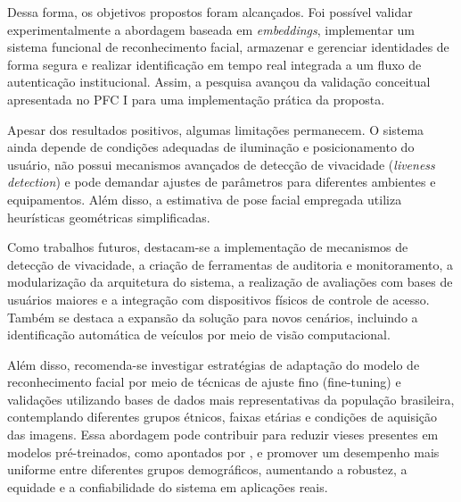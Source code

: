 Dessa forma, os objetivos propostos foram alcançados. Foi possível validar experimentalmente a abordagem baseada em \textit{embeddings}, implementar um sistema funcional de reconhecimento facial, armazenar e gerenciar identidades de forma segura e realizar identificação em tempo real integrada a um fluxo de autenticação institucional. Assim, a pesquisa avançou da validação conceitual apresentada no \acs{PFC} I para uma implementação prática da proposta.

Apesar dos resultados positivos, algumas limitações permanecem. O sistema ainda depende de condições adequadas de iluminação e posicionamento do usuário, não possui mecanismos avançados de detecção de vivacidade (\textit{liveness detection}) e pode demandar ajustes de parâmetros para diferentes ambientes e equipamentos. Além disso, a estimativa de pose facial empregada utiliza heurísticas geométricas simplificadas.

Como trabalhos futuros, destacam-se a implementação de mecanismos de detecção de vivacidade, a criação de ferramentas de auditoria e monitoramento, a modularização da arquitetura do sistema, a realização de avaliações com bases de usuários maiores e a integração com dispositivos físicos de controle de acesso. Também se destaca a expansão da solução para novos cenários, incluindo a identificação automática de veículos por meio de visão computacional.

Além disso, recomenda-se investigar estratégias de adaptação do modelo de reconhecimento facial por meio de técnicas de ajuste fino (fine-tuning) e validações utilizando bases de dados mais representativas da população brasileira, contemplando diferentes grupos étnicos, faixas etárias e condições de aquisição das imagens. Essa abordagem pode contribuir para reduzir vieses presentes em modelos pré-treinados, como apontados por \textcite{conectas2025ninadahora}, e promover um desempenho mais uniforme entre diferentes grupos demográficos, aumentando a robustez, a equidade e a confiabilidade do sistema em aplicações reais.
